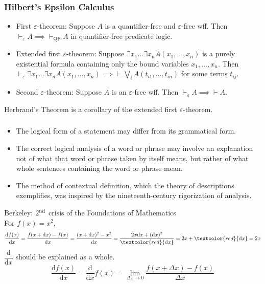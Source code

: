 \documentclass[UTF8,aspectratio=43,11pt,colorlinks,compress,openany]{beamer}%
\begin{document}
\begin{frame}\frametitle{Hilbert's Epsilon Calculus}
\begin{itemize}
	\item First $\varepsilon$-theorem: Suppose $A$ is a quantifier-free and $\varepsilon$-free wff. Then $\vdash_\varepsilon A\implies\vdash_{\mathrm{QF}} A$ in quantifier-free predicate logic.
	\item Extended first $\varepsilon$-theorem: Suppose $\exists x_1\dots\exists x_n A(x_1,\dots,x_n)$ is a purely existential formula containing only the bound variables $x_1,\dots,x_n$. Then $\vdash_\varepsilon\exists x_1\dots\exists x_n A(x_1,\dots,x_n)\implies\vdash\bigvee\limits_i A(t_{i1},\dots,t_{in})$ for some terms $t_{ij}$.
	\item Second $\varepsilon$-theorem: Suppose $A$ is an $\varepsilon$-free wff. Then $\vdash_\varepsilon A\implies \vdash A$.
\end{itemize}
Herbrand's Theorem is a corollary of the extended first $\varepsilon$-theorem.
\end{frame}

\begin{frame}\frametitle{}
\begin{itemize}
	\item The logical form of a statement may differ from its grammatical form.
	\item The correct logical analysis of a word or phrase may involve an explanation not of what that word or phrase taken by itself means, but rather of what whole sentences containing the word or phrase mean.
	\item The method of contextual definition, which the theory of descriptions exemplifies, was inspired by the nineteenth-century rigorization of analysis.
\end{itemize}
Berkeley: $2\textsuperscript{nd}$ crisis of the Foundations of Mathematics\\
For $f(x)=x^2$,
\[\dfrac{\mathrm{d} f(x)}{\mathrm{d}x}=\dfrac{f(x+\mathrm{d}x)-f(x)}{\mathrm{d}x}=\dfrac{(x+\mathrm{d}x)^2-x^2}{\mathrm{d}x}=\dfrac{2x\mathrm{d}x+(\mathrm{d}x)^2}{\textcolor{red}{\mathrm{d}x}}=2x+\textcolor{red}{\mathrm{d}x}=2x\]
$\dfrac{\mathrm{d}}{\mathrm{d}x}$ should be explained as a whole.
\[\dfrac{\mathrm{d} f(x)}{\mathrm{d}x}=\dfrac{\mathrm{d}}{\mathrm{d}x}f(x)=\lim\limits_{\Delta x\to 0}\dfrac{f(x+\Delta x)-f(x)}{\Delta x}\]
\end{frame}
\end{document}
